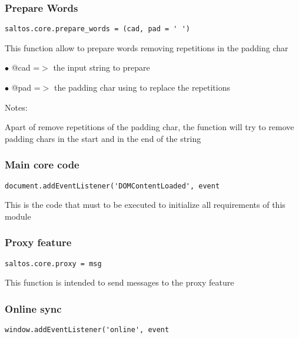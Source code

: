 \documentclass[a4paper]{article}
\begin{document}
\hypertarget{toc714}{}
\subsubsection{Prepare Words}

\begin{lstlisting}
saltos.core.prepare_words = (cad, pad = ' ')
\end{lstlisting}

This function allow to prepare words removing repetitions in the padding char

\begin{compactitem}
\item[\color{myblue}$\bullet$] @cad =$>$ the input string to prepare
\item[\color{myblue}$\bullet$] @pad =$>$ the padding char using to replace the repetitions
\end{compactitem}

Notes:

Apart of remove repetitions of the padding char, the function will try to
remove padding chars in the start and in the end of the string

\hypertarget{toc715}{}
\subsubsection{Main core code}

\begin{lstlisting}
document.addEventListener('DOMContentLoaded', event
\end{lstlisting}

This is the code that must to be executed to initialize all requirements of this module

\hypertarget{toc716}{}
\subsubsection{Proxy feature}

\begin{lstlisting}
saltos.core.proxy = msg
\end{lstlisting}

This function is intended to send messages to the proxy feature

\hypertarget{toc717}{}
\subsubsection{Online sync}

\begin{lstlisting}
window.addEventListener('online', event
\end{lstlisting}
\end{document}
